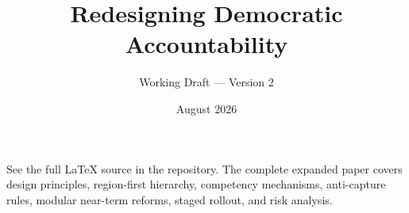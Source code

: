 \documentclass[11pt,a4paper]{article}
\title{Redesigning Democratic Accountability}
\author{Working Draft --- Version 2}
\date{August 2026}
\begin{document}
\maketitle

See the full LaTeX source in the repository. The complete expanded paper covers design principles, region-first hierarchy, competency mechanisms, anti-capture rules, modular near-term reforms, staged rollout, and risk analysis.
\end{document}
